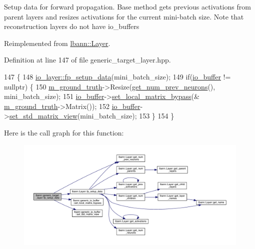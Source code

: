 Setup data for forward propagation. Base method gets previous activations from parent layers and resizes activations for the current mini-\/batch size. Note that reconstruction layers do not have io\+\_\+buffers 

Reimplemented from \hyperlink{classlbann_1_1Layer_af311d901a5f71e4c749454647e9fd9c7}{lbann\+::\+Layer}.



Definition at line 147 of file generic\+\_\+target\+\_\+layer.\+hpp.


\begin{DoxyCode}
147                                                    \{
148     \hyperlink{classlbann_1_1Layer_af311d901a5f71e4c749454647e9fd9c7}{io\_layer::fp\_setup\_data}(mini\_batch\_size);
149     \textcolor{keywordflow}{if}(\hyperlink{classlbann_1_1generic__target__layer_a8da650b94f50cc63fc90cd792fa50c3f}{io\_buffer} != \textcolor{keyword}{nullptr}) \{  
150       \hyperlink{classlbann_1_1generic__target__layer_acb9ba351caf22b8e2378e4cd1e256da7}{m\_ground\_truth}->Resize(\hyperlink{classlbann_1_1Layer_a27112eb70bbfbd7f3c3e749960400dec}{get\_num\_prev\_neurons}(), mini\_batch\_size);
151       \hyperlink{classlbann_1_1generic__target__layer_a8da650b94f50cc63fc90cd792fa50c3f}{io\_buffer}->\hyperlink{classlbann_1_1generic__io__buffer_af84c26ab5ee77d1d9ed9ea5d62823815}{set\_local\_matrix\_bypass}(&
      \hyperlink{classlbann_1_1generic__target__layer_acb9ba351caf22b8e2378e4cd1e256da7}{m\_ground\_truth}->Matrix());
152       \hyperlink{classlbann_1_1generic__target__layer_a8da650b94f50cc63fc90cd792fa50c3f}{io\_buffer}->\hyperlink{classlbann_1_1generic__io__buffer_a458d9bf722effce4177a0ac0aee9124f}{set\_std\_matrix\_view}(mini\_batch\_size);
153     \}
154   \}
\end{DoxyCode}
Here is the call graph for this function\+:\nopagebreak
\begin{figure}[H]
\begin{center}
\leavevmode
\includegraphics[width=350pt]{classlbann_1_1generic__target__layer_af89a8227784c005354bf937ec887a7ed_cgraph}
\end{center}
\end{figure}
\mbox{\label{classlbann_1_1generic__target__layer_abc0a5ec9761f3cebd34d3549d4681108}} 
